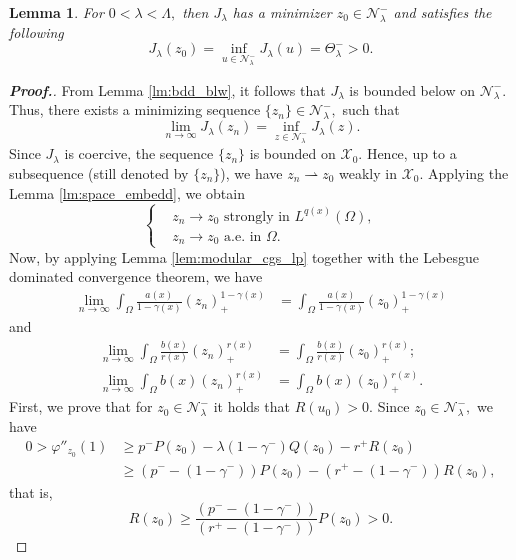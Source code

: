 \documentclass[11pt]{article}
\newtheorem{lemma}{Lemma}[section] %
\newcommand{\X}{\mathcal{X}_{0}}
\newcommand{\Nh}{\mathcal{N}_\la}
\newcommand{\Th} {\Theta}
\newcommand{\ga} {\gamma}
\newcommand{\om} {\Omega}
\newcommand{\la} {\lambda}
\newcommand{\La} {\Lambda}
\newcommand{\ra} {\rightarrow}
\newcommand{\weak}{\rightharpoonup}
\begin{document}
\begin{lemma}\label{lm:min_neg}
    For $0<\la<\La,$
then $J_\la$
has a minimizer $z_0\in \Nh^-$
and satisfies the following
$$
    J_\la(z_0)=
    \inf_{u\in \mathcal{N}_\la^-}J_\la(u)=\Th_\la^->0.
$$
\end{lemma}


\begin{proof}[\bf Proof.]
      From Lemma \ref{lm:bdd_blw}, 
      it follows that $J_\la$
is bounded below on $\Nh^-.$
Thus, there exists a minimizing sequence 
$\{z_n\}\in\Nh^-,$
such that
$$
    \lim_{n\to\infty} J_\la(z_n)=\inf_{z\in\Nh^-}J_\la(z).
$$
    Since $J_\la$
is coercive, the sequence $\{z_n\}$
is bounded on $\X.$
Hence, up to a subsequence 
(still denoted by $\{z_n\}$), 
we have $z_n\weak z_0$
weakly in $\X.$
Applying the Lemma \ref{lm:space_embedd}, 
we obtain
    \begin{equation*}
   \left\{
	\begin{aligned}
&z_n\ra z_0 \text{ strongly in }L^{q(x)}(\om),\\
&z_n\ra z_0 \text{ a.e. in } \om.
	\end{aligned}
    \right.
\end{equation*}
Now, by applying Lemma \ref{lem:modular_cgs_lp} 
together with the Lebesgue dominated 
convergence theorem, we have
\begin{equation}\label{eq29}
	\begin{aligned}
    \lim_{n\to\infty}
\int_\om 
\frac{a(x)}{1-\ga(x)}(z_n)_+^{1-\ga(x)}&=
\int_\om 
\frac{a(x)}{1-\ga(x)}(z_0)_+^{1-\ga(x)}
\end{aligned}
  \end{equation}
and 
\begin{equation}\label{eq21}
\begin{aligned}
    \lim_{n\to\infty}
\int_\om 
\frac{b(x)}{r(x)}(z_n)_+^{r(x)}&=
\int_\om 
\frac{b(x)}{r(x)}(z_0)_+^{r(x)};\\
    \lim_{n\to\infty}
\int_\om b(x)(z_n)_+^{r(x)}&=
\int_\om b(x)(z_0)_+^{r(x)}.
\end{aligned}
  \end{equation}
  First, we prove that for $z_0\in \Nh^-$
it holds that $R(u_0)>0.$
Since $z_0\in \Nh^-,$
we have
   \begin{align*}
0>\varphi''_{z_0}(1)&\ge p^-P(z_0)
-\la(1-\ga^-)Q(z_0)-r^+R(z_0)\\
&\ge (p^--(1-\ga^-))P(z_0)
-(r^+-(1-\ga^-))R(z_0),
    \end{align*}
    that is,
$$
    R(z_0)\ge 
\frac{(p^--(1-\ga^-))}{(r^+-(1-\ga^-))}P(z_0)>0.
$$
\end{proof}
\end{document}
